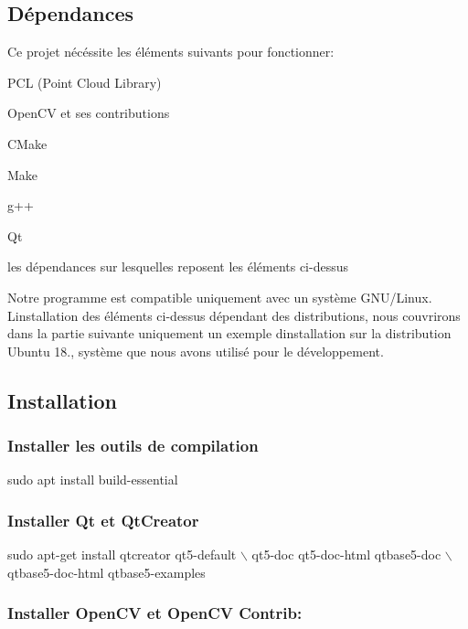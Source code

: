 \subsection*{Dépendances}

Ce projet nécéssite les éléments suivants pour fonctionner\+:


\begin{DoxyItemize}
\item P\+CL (Point Cloud Library)
\item Open\+CV et ses contributions
\item C\+Make
\item Make
\item g++
\item Qt
\item les dépendances sur lesquelles reposent les éléments ci-\/dessus
\end{DoxyItemize}

Notre programme est compatible uniquement avec un système G\+N\+U/\+Linux. L\textquotesingle{}installation des éléments ci-\/dessus dépendant des distributions, nous couvrirons dans la partie suivante uniquement un exemple d\textquotesingle{}installation sur la distribution Ubuntu 18., système que nous avons utilisé pour le développement.

\subsection*{Installation}

\subsubsection*{Installer les outils de compilation}


\begin{DoxyCode}
sudo apt install build-essential
\end{DoxyCode}


\subsubsection*{Installer Qt et Qt\+Creator}


\begin{DoxyCode}
sudo apt-get install qtcreator qt5-default \(\backslash\)
qt5-doc qt5-doc-html qtbase5-doc \(\backslash\)
qtbase5-doc-html qtbase5-examples
\end{DoxyCode}


\subsubsection*{Installer Open\+CV et Open\+CV Contrib\+:}


